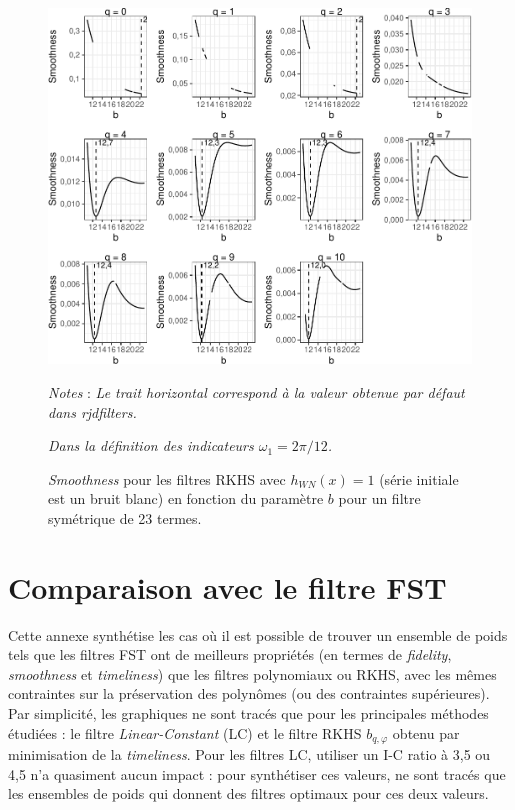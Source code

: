 \documentclass[
  11pt,
  french,
  a4paper]{article}
\newcommand\1{\mathds{1}}
\begin{document}
\begin{figure}[H]

{\centering \includegraphics{img/bookdown/pdf/rkhsoptismoothness11wn-1} 

}

\caption[\emph{Smoothness} pour les filtres RKHS avec \(h_{WN}(x)=1\) (série initiale est un bruit blanc) en fonction du paramètre \(b\) pour un filtre symétrique de 23 termes]{\emph{Smoothness} pour les filtres RKHS avec \(h_{WN}(x)=1\) (série initiale est un bruit blanc) en fonction du paramètre \(b\) pour un filtre symétrique de 23 termes.}\label{fig:rkhsoptismoothness11wn}

\footnotesize


\emph{Notes} : \emph{Le trait horizontal correspond à la valeur obtenue par défaut dans rjdfilters.}

\emph{Dans la définition des indicateurs \(\omega_1=2\pi/12\).}
\normalsize\end{figure}

\newpage

\hypertarget{sec-annexeFST}{%
\section{Comparaison avec le filtre FST}\label{sec-annexeFST}}

Cette annexe synthétise les cas où il est possible de trouver un ensemble de poids tels que les filtres FST ont de meilleurs propriétés (en termes de \emph{fidelity}, \emph{smoothness} et \emph{timeliness}) que les filtres polynomiaux ou RKHS, avec les mêmes contraintes sur la préservation des polynômes (ou des contraintes supérieures).
Par simplicité, les graphiques ne sont tracés que pour les principales méthodes étudiées : le filtre \emph{Linear-Constant} (LC) et le filtre RKHS \(b_{q,\varphi}\) obtenu par minimisation de la \emph{timeliness}.
Pour les filtres LC, utiliser un I-C ratio à 3,5 ou 4,5 n'a quasiment aucun impact : pour synthétiser ces valeurs, ne sont tracés que les ensembles de poids qui donnent des filtres optimaux pour ces deux valeurs.
\end{document}
